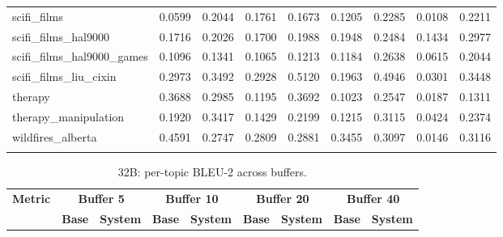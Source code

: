 \begin{landscape}
\begin{longtable}{@{}p{3.8cm}cccccccc@{}}
scifi\_films & 0.0599 & 0.2044 & 0.1761 & 0.1673 & 0.1205 & 0.2285 & 0.0108 & 0.2211 \\
scifi\_films\_hal9000 & 0.1716 & 0.2026 & 0.1700 & 0.1988 & 0.1948 & 0.2484 & 0.1434 & 0.2977 \\
scifi\_films\_hal9000\_games & 0.1096 & 0.1341 & 0.1065 & 0.1213 & 0.1184 & 0.2638 & 0.0615 & 0.2044 \\
scifi\_films\_liu\_cixin & 0.2973 & 0.3492 & 0.2928 & 0.5120 & 0.1963 & 0.4946 & 0.0301 & 0.3448 \\
therapy & 0.3688 & 0.2985 & 0.1195 & 0.3692 & 0.1023 & 0.2547 & 0.0187 & 0.1311 \\
therapy\_manipulation & 0.1920 & 0.3417 & 0.1429 & 0.2199 & 0.1215 & 0.3115 & 0.0424 & 0.2374 \\
wildfires\_alberta & 0.4591 & 0.2747 & 0.2809 & 0.2881 & 0.3455 & 0.3097 & 0.0146 & 0.3116 \\
\botrule
\end{longtable}
\begin{longtable}{@{}p{3.8cm}cccccccc@{}}
\caption{32B: per-topic BLEU-2 across buffers.}\label{tab:app_32b_bleu_topics}\\

\toprule
\textbf{Metric} & \multicolumn{2}{c}{\textbf{Buffer 5}} & \multicolumn{2}{c}{\textbf{Buffer 10}} & \multicolumn{2}{c}{\textbf{Buffer 20}} & \multicolumn{2}{c}{\textbf{Buffer 40}} \\
\cmidrule(lr){2-3}\cmidrule(lr){4-5}\cmidrule(lr){6-7}\cmidrule(lr){8-9}
 & \textbf{Base} & \textbf{System} & \textbf{Base} & \textbf{System} & \textbf{Base} & \textbf{System} & \textbf{Base} & \textbf{System} \\
\midrule
\endfirsthead


\end{longtable}
\end{landscape}
